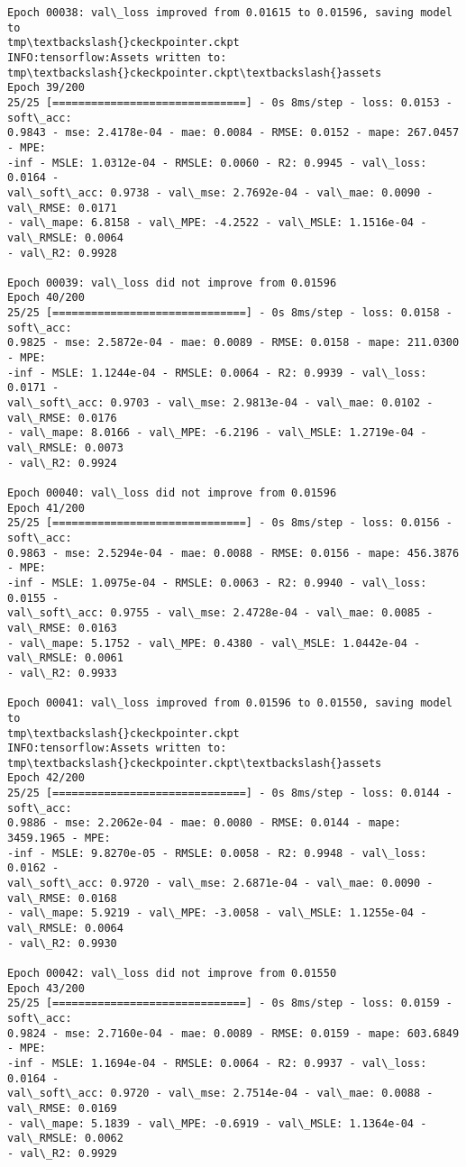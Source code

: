 \documentclass[11pt]{article}
\begin{document}
\begin{Verbatim}[commandchars=\\\{\}]
Epoch 00038: val\_loss improved from 0.01615 to 0.01596, saving model to
tmp\textbackslash{}ckeckpointer.ckpt
INFO:tensorflow:Assets written to: tmp\textbackslash{}ckeckpointer.ckpt\textbackslash{}assets
Epoch 39/200
25/25 [==============================] - 0s 8ms/step - loss: 0.0153 - soft\_acc:
0.9843 - mse: 2.4178e-04 - mae: 0.0084 - RMSE: 0.0152 - mape: 267.0457 - MPE:
-inf - MSLE: 1.0312e-04 - RMSLE: 0.0060 - R2: 0.9945 - val\_loss: 0.0164 -
val\_soft\_acc: 0.9738 - val\_mse: 2.7692e-04 - val\_mae: 0.0090 - val\_RMSE: 0.0171
- val\_mape: 6.8158 - val\_MPE: -4.2522 - val\_MSLE: 1.1516e-04 - val\_RMSLE: 0.0064
- val\_R2: 0.9928

Epoch 00039: val\_loss did not improve from 0.01596
Epoch 40/200
25/25 [==============================] - 0s 8ms/step - loss: 0.0158 - soft\_acc:
0.9825 - mse: 2.5872e-04 - mae: 0.0089 - RMSE: 0.0158 - mape: 211.0300 - MPE:
-inf - MSLE: 1.1244e-04 - RMSLE: 0.0064 - R2: 0.9939 - val\_loss: 0.0171 -
val\_soft\_acc: 0.9703 - val\_mse: 2.9813e-04 - val\_mae: 0.0102 - val\_RMSE: 0.0176
- val\_mape: 8.0166 - val\_MPE: -6.2196 - val\_MSLE: 1.2719e-04 - val\_RMSLE: 0.0073
- val\_R2: 0.9924

Epoch 00040: val\_loss did not improve from 0.01596
Epoch 41/200
25/25 [==============================] - 0s 8ms/step - loss: 0.0156 - soft\_acc:
0.9863 - mse: 2.5294e-04 - mae: 0.0088 - RMSE: 0.0156 - mape: 456.3876 - MPE:
-inf - MSLE: 1.0975e-04 - RMSLE: 0.0063 - R2: 0.9940 - val\_loss: 0.0155 -
val\_soft\_acc: 0.9755 - val\_mse: 2.4728e-04 - val\_mae: 0.0085 - val\_RMSE: 0.0163
- val\_mape: 5.1752 - val\_MPE: 0.4380 - val\_MSLE: 1.0442e-04 - val\_RMSLE: 0.0061
- val\_R2: 0.9933

Epoch 00041: val\_loss improved from 0.01596 to 0.01550, saving model to
tmp\textbackslash{}ckeckpointer.ckpt
INFO:tensorflow:Assets written to: tmp\textbackslash{}ckeckpointer.ckpt\textbackslash{}assets
Epoch 42/200
25/25 [==============================] - 0s 8ms/step - loss: 0.0144 - soft\_acc:
0.9886 - mse: 2.2062e-04 - mae: 0.0080 - RMSE: 0.0144 - mape: 3459.1965 - MPE:
-inf - MSLE: 9.8270e-05 - RMSLE: 0.0058 - R2: 0.9948 - val\_loss: 0.0162 -
val\_soft\_acc: 0.9720 - val\_mse: 2.6871e-04 - val\_mae: 0.0090 - val\_RMSE: 0.0168
- val\_mape: 5.9219 - val\_MPE: -3.0058 - val\_MSLE: 1.1255e-04 - val\_RMSLE: 0.0064
- val\_R2: 0.9930

Epoch 00042: val\_loss did not improve from 0.01550
Epoch 43/200
25/25 [==============================] - 0s 8ms/step - loss: 0.0159 - soft\_acc:
0.9824 - mse: 2.7160e-04 - mae: 0.0089 - RMSE: 0.0159 - mape: 603.6849 - MPE:
-inf - MSLE: 1.1694e-04 - RMSLE: 0.0064 - R2: 0.9937 - val\_loss: 0.0164 -
val\_soft\_acc: 0.9720 - val\_mse: 2.7514e-04 - val\_mae: 0.0088 - val\_RMSE: 0.0169
- val\_mape: 5.1839 - val\_MPE: -0.6919 - val\_MSLE: 1.1364e-04 - val\_RMSLE: 0.0062
- val\_R2: 0.9929


\end{Verbatim}
\end{document}
